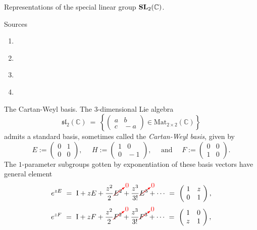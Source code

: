 \documentclass[letterpaper,11pt, reqno]{amsart}
\newtheorem{monodromy theorem}{Monodromy Theorem}[subsection]
\newtheorem{wild conjecture}[theorem]{Wild Conjecture}
\newtheorem{research objectives}{Research objectives}[subsection]
\newtheorem{research question}[theorem]{Research questions}
\newtheorem{aside question}[theorem]{Aside question}
\newtheorem{audio example}[theorem]{\loudspeaker[3] Example}
\newtheorem{blank remark}[theorem]{}
\newtheorem{terminology and comment}[theorem]{Terminology and comment}
\newtheorem{purity hypothesis}[theorem]{Purity hypothesis}
\newtheorem{corollary of the purity hypothesis}[theorem]{Corollary of the purity hypothesis}
\newcommand{\CC} {{\mathbb C}}
\numberwithin{equation}{theorem}
\begin{document}
\begin{section}{Representations of the special linear group $\bold{SL}_{2}(\CC)$.}

\begin{subsection}{Sources}
	\begin{enumerate}[{\bf\ \ \ \ \ \ 1.}]
	\item
	\cite{FH}
	\item
	\cite{Proc}
	\item
	\cite{Knapp86}
	\item
	\cite{Knapp02}
	\end{enumerate}
\end{subsection}

\begin{subsection}{The Cartan-Weyl basis.} The $3$-dimensional Lie algebra
	$$
	\mathfrak{sl}_2(\CC)
	\ =\ 
	\left\{
	\left(\!\begin{array}{cc}a & b \\ c & \!\!-a\end{array}\!\right)\in\text{Mat}_{2\times2}(\CC)
	\right\}
	$$
admits a standard basis, sometimes called the {\em Cartan-Weyl basis}, given by
	$$
	E:=\left(\!\begin{array}{cc}0 & 1 \\ 0 & 0\end{array}\!\right),
	\ \ \ \ \ \ 
	H:=\left(\!\begin{array}{cc}1 & 0 \\ 0 & \!\!-1\end{array}\!\right),
	\ \ \ \ \ \ 
	\text{and}
	\ \ \ \ \ \ 
	F:=\left(\!\begin{array}{cc} 0 & 0 \\ 1 & 0\end{array}\!\right).
	$$
The $1$-parameter subgroups gotten by exponentiation of these basis vectors have general element
	$$
	e^{zE}
	\ =\ 
	\text{I}+zE+\frac{z^2}{2}{\color{red} \cancelto{0}{{\color{black} E^2}}}+\frac{z^3}{3!}{\color{red} \cancelto{0}{{\color{black} E^3}}}+\cdots
	\ =\ 
	\left(\!\begin{array}{cc} 1 & z \\ 0 & 1\end{array}\!\right),
	$$
	$$
	e^{zF}
	\ =\ 
	\text{I}+zF+\frac{z^2}{2}{\color{red} \cancelto{0}{{\color{black} F^2}}}+\frac{z^3}{3!}{\color{red} \cancelto{0}{{\color{black} F^3}}}+\cdots
	\ =\ 
	\left(\!\begin{array}{cc} 1 & 0 \\ z & 1\end{array}\!\right),
$$
\end{subsection}
\end{section}
\end{document}
